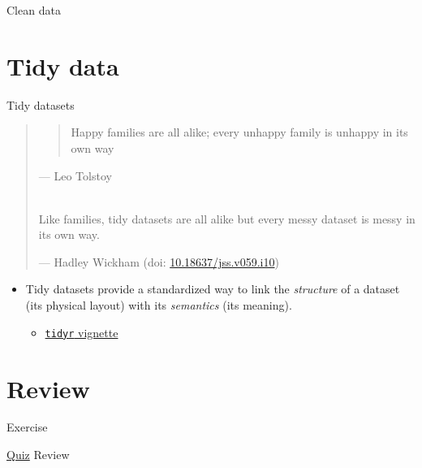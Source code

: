 \documentclass[
  11pt,
  ignorenonframetext,
]{beamer}
\providecommand{\tightlist}{%
  \setlength{\itemsep}{0pt}\setlength{\parskip}{0pt}}
\begin{document}
\begin{frame}{Clean data}
\end{frame}

\hypertarget{tidy-data}{%
\section{Tidy data}\label{tidy-data}}

\begin{frame}[fragile]{Tidy datasets}
\protect\hypertarget{tidy-datasets}{}
\begin{quote}
\begin{quote}
Happy families are all alike; every unhappy family is unhappy in its own
way
\end{quote}

--- Leo Tolstoy\\
\strut \\
Like families, tidy datasets are all alike but every messy dataset is
messy in its own way.

--- Hadley Wickham (doi:
\href{https://doi.org/10.18637/jss.v059.i10}{10.18637/jss.v059.i10})
\end{quote}

\begin{itemize}
\item
  Tidy datasets provide a standardized way to link the \emph{structure}
  of a dataset (its physical layout) with its \emph{semantics} (its
  meaning).

  \begin{itemize}
  \tightlist
  \item
    \href{https://cran.r-project.org/web/packages/tidyr/vignettes/tidy-data.html}{\texttt{tidyr}
    vignette}
  \end{itemize}
\end{itemize}
\end{frame}

\hypertarget{review}{%
\section{Review}\label{review}}

\begin{frame}{Exercise}
\protect\hypertarget{exercise}{}
\end{frame}

\begin{frame}[fragile]{\protect\hyperlink{pop-quiz}{Quiz} Review}
\protect\hypertarget{quiz-review}{}
\end{frame}
\end{document}
